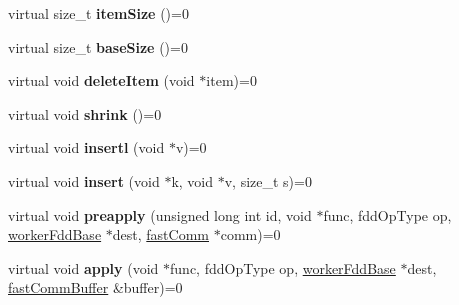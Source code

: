 \begin{DoxyCompactItemize}
\item 
\hypertarget{classfaster_1_1workerFddBase_a11e77f238c760ce939ceeaa7f36a7899}{}virtual size\+\_\+t {\bfseries item\+Size} ()=0\label{classfaster_1_1workerFddBase_a11e77f238c760ce939ceeaa7f36a7899}

\item 
\hypertarget{classfaster_1_1workerFddBase_adf7e8dd9728b866d37bc32aeba4e7c3c}{}virtual size\+\_\+t {\bfseries base\+Size} ()=0\label{classfaster_1_1workerFddBase_adf7e8dd9728b866d37bc32aeba4e7c3c}

\item 
\hypertarget{classfaster_1_1workerFddBase_aac667e68629f17c9c5cd30bf9701f03c}{}virtual void {\bfseries delete\+Item} (void $\ast$item)=0\label{classfaster_1_1workerFddBase_aac667e68629f17c9c5cd30bf9701f03c}

\item 
\hypertarget{classfaster_1_1workerFddBase_afd958be3b502d6147e3145c4d2926452}{}virtual void {\bfseries shrink} ()=0\label{classfaster_1_1workerFddBase_afd958be3b502d6147e3145c4d2926452}

\item 
\hypertarget{classfaster_1_1workerFddBase_a7e2a919ffa1ecd117c2d487957f9e431}{}virtual void {\bfseries insertl} (void $\ast$v)=0\label{classfaster_1_1workerFddBase_a7e2a919ffa1ecd117c2d487957f9e431}

\item 
\hypertarget{classfaster_1_1workerFddBase_adef4d0ad067b5bc9ca39d21260b46818}{}virtual void {\bfseries insert} (void $\ast$k, void $\ast$v, size\+\_\+t s)=0\label{classfaster_1_1workerFddBase_adef4d0ad067b5bc9ca39d21260b46818}

\item 
\hypertarget{classfaster_1_1workerFddBase_a6dbb190837ac0eecf4c2a4b4c3f95920}{}virtual void {\bfseries preapply} (unsigned long int id, void $\ast$func, fdd\+Op\+Type op, \hyperlink{classfaster_1_1workerFddBase}{worker\+Fdd\+Base} $\ast$dest, \hyperlink{classfaster_1_1fastComm}{fast\+Comm} $\ast$comm)=0\label{classfaster_1_1workerFddBase_a6dbb190837ac0eecf4c2a4b4c3f95920}

\item 
\hypertarget{classfaster_1_1workerFddBase_a875b78e89873f4b4b88611f8e1127baa}{}virtual void {\bfseries apply} (void $\ast$func, fdd\+Op\+Type op, \hyperlink{classfaster_1_1workerFddBase}{worker\+Fdd\+Base} $\ast$dest, \hyperlink{classfaster_1_1fastCommBuffer}{fast\+Comm\+Buffer} \&buffer)=0\label{classfaster_1_1workerFddBase_a875b78e89873f4b4b88611f8e1127baa}


\end{DoxyCompactItemize}
